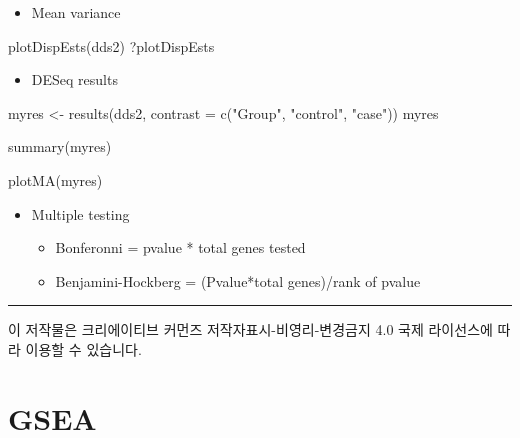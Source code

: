 \documentclass[
]{book}
\newenvironment{Shaded}{\begin{snugshade}}{\end{snugshade}}
\newcommand{\AttributeTok}[1]{\textcolor[rgb]{0.77,0.63,0.00}{#1}}
\newcommand{\FunctionTok}[1]{\textcolor[rgb]{0.00,0.00,0.00}{#1}}
\newcommand{\NormalTok}[1]{#1}
\newcommand{\OtherTok}[1]{\textcolor[rgb]{0.56,0.35,0.01}{#1}}
\newcommand{\StringTok}[1]{\textcolor[rgb]{0.31,0.60,0.02}{#1}}
\providecommand{\tightlist}{%
  \setlength{\itemsep}{0pt}\setlength{\parskip}{0pt}}
\begin{document}
\begin{itemize}
\tightlist
\item
  Mean variance
\end{itemize}

\begin{Shaded}
\begin{Highlighting}[]

\FunctionTok{plotDispEsts}\NormalTok{(dds2)}
\NormalTok{?plotDispEsts}
\end{Highlighting}
\end{Shaded}

\begin{itemize}
\tightlist
\item
  DESeq results
\end{itemize}

\begin{Shaded}
\begin{Highlighting}[]

\NormalTok{myres }\OtherTok{\textless{}{-}} \FunctionTok{results}\NormalTok{(dds2, }\AttributeTok{contrast =} \FunctionTok{c}\NormalTok{(}\StringTok{"Group"}\NormalTok{, }\StringTok{"control"}\NormalTok{, }\StringTok{"case"}\NormalTok{))}
\NormalTok{myres}

\FunctionTok{summary}\NormalTok{(myres)}

\FunctionTok{plotMA}\NormalTok{(myres)}
\end{Highlighting}
\end{Shaded}

\begin{itemize}
\tightlist
\item
  Multiple testing

  \begin{itemize}
  \tightlist
  \item
    Bonferonni = pvalue * total genes tested
  \item
    Benjamini-Hockberg = (Pvalue*total genes)/rank of pvalue
  \end{itemize}
\end{itemize}

\begin{center}\rule{0.5\linewidth}{0.5pt}\end{center}

이 저작물은 크리에이티브 커먼즈 저작자표시-비영리-변경금지 4.0 국제 라이선스에 따라 이용할 수 있습니다.

\hypertarget{gsea}{%
\chapter{GSEA}\label{gsea}}
\end{document}
